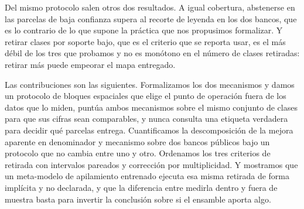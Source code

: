 Del mismo protocolo salen otros dos resultados. A igual cobertura, abstenerse en las parcelas de
baja confianza supera al recorte de leyenda en los dos bancos, que es lo contrario de lo que
supone la práctica que nos propusimos formalizar. Y retirar clases por soporte bajo, que es el
criterio que se reporta usar, es el más débil de los tres que probamos y no es monótono en el
número de clases retiradas: retirar más puede empeorar el mapa entregado.

Las contribuciones son las siguientes. Formalizamos los dos mecanismos y damos un protocolo de
bloques espaciales que elige el punto de operación fuera de los datos que lo miden, puntúa ambos
mecanismos sobre el mismo conjunto de clases para que sus cifras sean comparables, y nunca consulta
una etiqueta verdadera para decidir qué parcelas entrega. Cuantificamos la descomposición de la
mejora aparente en denominador y mecanismo sobre dos bancos públicos bajo un protocolo que no
cambia entre uno y otro. Ordenamos los tres criterios de retirada con intervalos pareados y
corrección por multiplicidad. Y mostramos que un meta-modelo de apilamiento entrenado ejecuta esa
misma retirada de forma implícita y no declarada, y que la diferencia entre medirla dentro y fuera
de muestra basta para invertir la conclusión sobre si el ensamble aporta algo.
